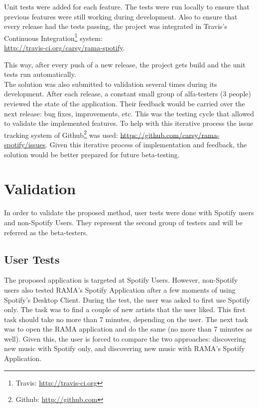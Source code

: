     Unit tests were added for each feature.
    The tests were run locally to ensure that previous features were still working during development.
    Also to ensure that every release had the tests passing, the project was integrated in Travis's Continuous Integration\footnote{Travis: \url{http://travis-ci.org}} system: \\
    \indent \url{http://travis-ci.org/carsy/rama-spotify}.

    This way, after every push of a new release, the project gets build and the unit tests run automatically. \\

    The solution was also submitted to validation several times during its development.
    After each release, a constant small group of alfa-testers (3 people) reviewed the state of the application.
    Their feedback would be carried over the next release: bug fixes, improvements, etc.
    This was the testing cycle that allowed to validate the implemented features.
    To help with this iterative process the issue tracking system of Github\footnote{Github: \url{http://github.com}} was used: \url{https://github.com/carsy/rama-spotify/issues}.
    Given this iterative process of implementation and feedback, the solution would be better prepared for future beta-testing.



  \clearpage

\section{Validation} %
\label{sec:validation}

  In order to validate the proposed method, user tests were done with Spotify users and non-Spotify Users.
  They represent the second group of testers and will be referred as the beta-testers.

  \subsection{User Tests} %
  \label{sub:user_tests}

    The proposed application is targeted at Spotify Users.
    However, non-Spotify users also tested RAMA's Spotify Application after a few moments of using Spotify's Desktop Client.
    During the test, the user was asked to first use Spotify only.
    The task was to find a couple of new artists that the user liked.
    This first task should take no more than 7 minutes, depending on the user.
    The next task was to open the RAMA application and do the same (no more than 7 minutes as well).
    Given this, the user is forced to compare the two approaches: discovering new music with Spotify only, and discovering new music with RAMA's Spotify Application.

